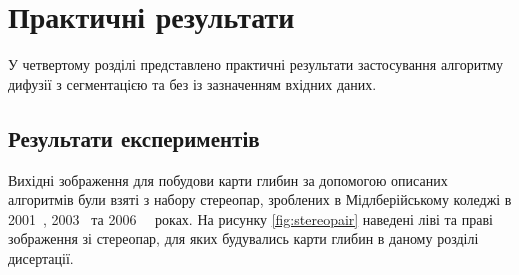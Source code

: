 \chapter{Практичні результати}

У четвертому розділі представлено практичні результати
застосування алгоритму дифузії з сегментацією
та без із зазначенням вхідних даних.

\section{Результати експериментів}

Вихідні зображення для побудови карти глибин
за допомогою описаних алгоритмів були взяті з набору стереопар,
зроблених в Мідлберійському коледжі в 2001~\cite{middlebury:ds:2001},
2003~\cite{middlebury:ds:2003}
та 2006~\cite{middlebury:ds:2006:1}~\cite{middlebury:ds:2006:2} роках.
На рисунку \ref{fig:stereopair} наведені ліві та праві зображення зі стереопар,
для яких будувались карти глибин в даному розділі дисертації.

